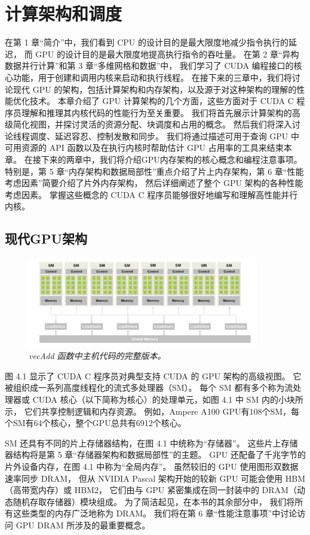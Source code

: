 \section{计算架构和调度}
在第 1 章“简介”中，我们看到 CPU 的设计目的是最大限度地减少指令执行的延迟，
而 GPU 的设计目的是最大限度地提高执行指令的吞吐量。 在第 2 章“异构数据并行计算”和第 3 章“多维网格和数据”中，
我们学习了 CUDA 编程接口的核心功能，用于创建和调用内核来启动和执行线程。 
在接下来的三章中，我们将讨论现代 GPU 的架构，包括计算架构和内存架构，以及源于对这种架构的理解的性能优化技术。 
本章介绍了 GPU 计算架构的几个方面，这些方面对于 CUDA C 程序员理解和推理其内核代码的性能行为至关重要。 
我们将首先展示计算架构的高级简化视图，并探讨灵活的资源分配、块调度和占用的概念。 
然后我们将深入讨论线程调度、延迟容忍、控制发散和同步。 
我们将通过描述可用于查询 GPU 中可用资源的 API 函数以及在执行内核时帮助估计 GPU 占用率的工具来结束本章。 
在接下来的两章中，我们将介绍GPU内存架构的核心概念和编程注意事项。 
特别是，第 5 章“内存架构和数据局部性”重点介绍了片上内存架构，第 6 章“性能考虑因素”简要介绍了片外内存架构，
然后详细阐述了整个 GPU 架构的各种性能考虑因素。 掌握这些概念的 CUDA C 程序员能够很好地编写和理解高性能并行内核。

\subsection{现代GPU架构}
\begin{figure}[H]
	\centering
	\includegraphics[width=0.9\textwidth]{figs/F4.1.png}
	\caption{\textit{\color{red} vecAdd 函数中主机代码的完整版本。}}
\end{figure}

图 4.1 显示了 CUDA C 程序员对典型支持 CUDA 的 GPU 架构的高级视图。 它被组织成一系列高度线程化的流式多处理器（SM）。 
每个 SM 都有多个称为流处理器或 CUDA 核心（以下简称为核心）的处理单元，如图 4.1 中 SM 内的小块所示，
它们共享控制逻辑和内存资源。 例如，Ampere A100 GPU有108个SM，每个SM有64个核心，整个GPU总共有6912个核心。

SM 还具有不同的片上存储器结构，在图 4.1 中统称为“存储器”。 这些片上存储器结构将是第 5 章“存储器架构和数据局部性”的主题。 
GPU 还配备了千兆字节的片外设备内存，在图 4.1 中称为“全局内存”。 虽然较旧的 GPU 使用图形双数据速率同步 DRAM，
但从 NVIDIA Pascal 架构开始的较新 GPU 可能会使用 HBM（高带宽内存）或 HBM2，
它们由与 GPU 紧密集成在同一封装中的 DRAM（动态随机存取存储器）模块组成。 为了简洁起见，在本书的其余部分中，
我们将所有这些类型的内存广泛地称为 DRAM。 我们将在第 6 章“性能注意事项”中讨论访问 GPU DRAM 所涉及的最重要概念。

